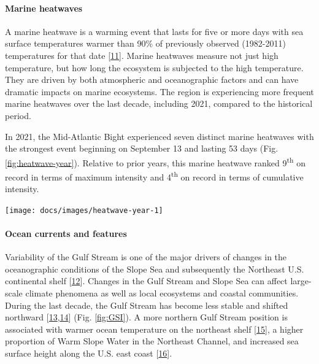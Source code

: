 \documentclass[
  10pt,
]{article}
\let\origfigure\figure
\let\endorigfigure\endfigure
\renewenvironment{figure}[1][2] {
    \expandafter\origfigure\expandafter[H]
} {
    \endorigfigure
}
\begin{document}
\hypertarget{marine-heatwaves}{%
\paragraph{Marine heatwaves}\label{marine-heatwaves}}

A marine heatwave is a warming event that lasts for five or more days
with sea surface temperatures warmer than 90\% of previously observed
(1982-2011) temperatures for that date
{[}\protect\hyperlink{ref-hobday_hierarchical_2016}{11}{]}. Marine
heatwaves measure not just high temperature, but how long the ecosystem
is subjected to the high temperature. They are driven by both
atmospheric and oceanographic factors and can have dramatic impacts on
marine ecosystems. The region is experiencing more frequent marine
heatwaves over the last decade, including 2021, compared to the
historical period.

In 2021, the Mid-Atlantic Bight experienced seven distinct marine
heatwaves with the strongest event beginning on September 13 and lasting
53 days (Fig. \ref{fig:heatwave-year}). Relative to prior years, this
marine heatwave ranked 9\textsuperscript{th} on record in terms of
maximum intensity and 4\textsuperscript{th} on record in terms of
cumulative intensity.

\begin{figure}

{\centering \texttt{[image: docs/images/heatwave-year-1]} 

}

\caption{Marine heatwave events (red shading above black line) in the Mid-Atlantic occuring in 2021.}\label{fig:heatwave-year}
\end{figure}

\hypertarget{ocean-currents-and-features}{%
\paragraph{Ocean currents and
features}\label{ocean-currents-and-features}}

Variability of the Gulf Stream is one of the major drivers of changes in
the oceanographic conditions of the Slope Sea and subsequently the
Northeast U.S. continental shelf
{[}\protect\hyperlink{ref-gangopadhyay_census_2020}{12}{]}. Changes in
the Gulf Stream and Slope Sea can affect large-scale climate phenomena
as well as local ecosystems and coastal communities. During the last
decade, the Gulf Stream has become less stable and shifted northward
{[}\protect\hyperlink{ref-andres_recent_2016}{13},\protect\hyperlink{ref-caesar_observed_2018}{14}{]}
(Fig. \ref{fig:GSI}). A more northern Gulf Stream position is associated
with warmer ocean temperature on the northeast shelf
{[}\protect\hyperlink{ref-zhang_role_2007}{15}{]}, a higher proportion
of Warm Slope Water in the Northeast Channel, and increased sea surface
height along the U.S. east coast
{[}\protect\hyperlink{ref-goddard_extreme_2015}{16}{]}.
\end{document}
